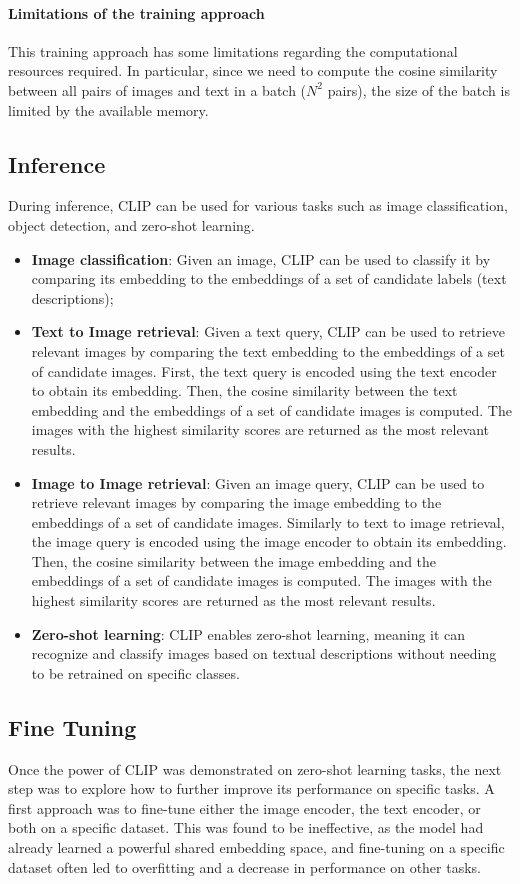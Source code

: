\paragraph{Limitations of the training approach}
\label{CLIP:training-limitations}
This training approach has some limitations regarding the computational resources required. 
In particular, since we need to compute the cosine similarity between all pairs of images and text in a batch ($N^2$ pairs),
the size of the batch is limited by the available memory.

\subsection{Inference}
During inference, CLIP can be used for various tasks such as image classification, object detection, and zero-shot learning.
\begin{itemize}
    \item \textbf{Image classification}: Given an image, CLIP can be used to classify it by comparing its embedding to the embeddings of a set of candidate labels (text descriptions);
    \item \textbf{Text to Image retrieval}: Given a text query, CLIP can be used to retrieve relevant images by comparing the text embedding to the embeddings of a set of candidate images.
    First, the text query is encoded using the text encoder to obtain its embedding. Then, the cosine similarity between the text embedding and the embeddings of a set of candidate images is computed. 
    The images with the highest similarity scores are returned as the most relevant results.
    \item \textbf{Image to Image retrieval}: Given an image query, CLIP can be used to retrieve relevant images by comparing the image embedding to the embeddings of a set of candidate images.
    Similarly to text to image retrieval, the image query is encoded using the image encoder to obtain its embedding. Then, the cosine similarity between the image embedding and the embeddings of a set of candidate images is computed.
    The images with the highest similarity scores are returned as the most relevant results.
    \item \textbf{Zero-shot learning}: CLIP enables zero-shot learning, meaning it can recognize and classify images based on textual descriptions without needing to be retrained on specific classes.
\end{itemize}

\subsection{Fine Tuning}
Once the power of CLIP was demonstrated on zero-shot learning tasks, the next step was to explore how to further improve its performance on specific tasks.
A first approach was to fine-tune either the image encoder, the text encoder, or both on a specific dataset.
This was found to be ineffective, as the model had already learned a powerful shared embedding space, and fine-tuning on a specific dataset often led 
to overfitting and a decrease in performance on other tasks.

